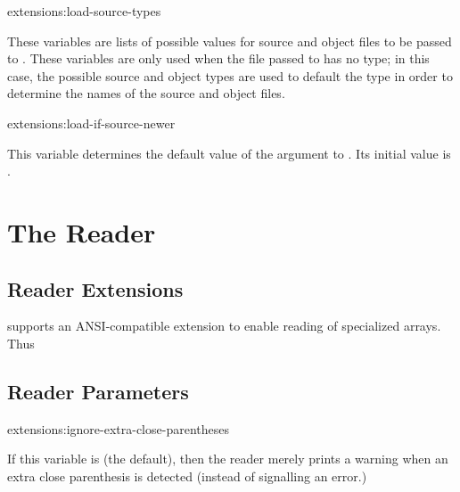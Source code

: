 \begin{defvar}{extensions:}{load-source-types}
  
  These variables are lists of possible  values
  for source and object files to be passed to .  These
  variables are only used when the file passed to  has no
  type; in this case, the possible source and object types are used to
  default the type in order to determine the names of the source and
  object files.
\end{defvar}

\begin{defvar}{extensions:}{load-if-source-newer}
  
  This variable determines the default value of the
   argument to .  Its initial value is
  .
\end{defvar}


\section{The Reader}

\subsection{Reader Extensions}
\cmucl{} supports an ANSI-compatible extension to enable reading of
specialized arrays.  Thus

\subsection{Reader Parameters}
\begin{defvar}{extensions:}{ignore-extra-close-parentheses}
  
  If this variable is \true{} (the default), then the reader merely
  prints a warning when an extra close parenthesis is detected
  (instead of signalling an error.)
\end{defvar}


